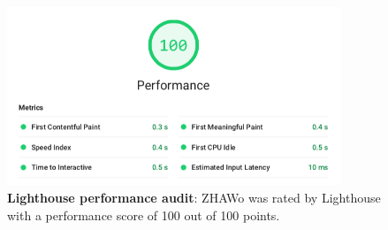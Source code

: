 \begin{markdown}
\begin{figure}[H]
  \includegraphics[width=10cm, center]{../../metrics/ZHAWoLighthousereportBAPreformance.png}
  \captionsetup{width=15.5cm}
  \caption [Lighthouse peformance audit]{\textbf{Lighthouse performance audit}: ZHAWo was rated by Lighthouse with a performance score of 100 out of 100 points.}
  \label{fig:LighthousePreformance}
\end{figure}

\newpage

\end{markdown}


